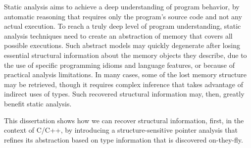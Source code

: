 
Static analysis aims to achieve a deep understanding of program
behavior, by automatic reasoning that requires only the program's
source code and not any actual execution. To reach a truly deep level
of program understanding, static analysis techniques need to create an
abstraction of memory that covers all possible executions. Such
abstract models may quickly degenerate after losing essential
structural information about the memory objects they describe, due to
the use of specific programming idioms and language features, or
because of practical analysis limitations. In many cases, some of the
lost memory structure may be retrieved, though it requires complex
inference that takes advantage of indirect uses of types. Such
recovered structural information may, then, greatly benefit static
analysis.

This dissertation shows how we can recover structural information,
first, in the context of C/C++, by introducing a structure-sensitive
pointer analysis that refines its abstraction based on type
information that is discovered on-they-fly.


